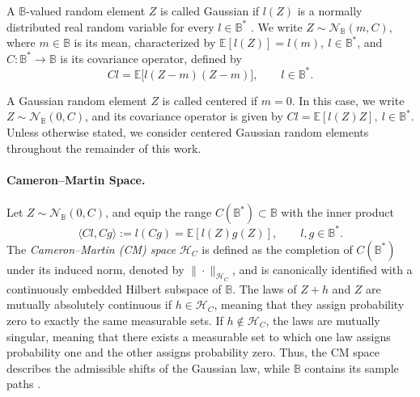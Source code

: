\documentclass[twoside,11pt]{article}
\newcommand{\inner}[2]{\langle #1, #2 \rangle} %
\begin{document}
A $\mathbb{B}$-valued random element $Z$ is called Gaussian if $l(Z)$ is a normally distributed real random variable for every $l\in\mathbb{B}^*$ \citep{ledoux1991probability}. We write $Z\sim\mathcal{N}_{\mathbb{B}}(m,C)$, where $m\in\mathbb B$ is its mean, characterized by $\mathbb{E}[l(Z)] = l(m),\ l\in \mathbb{B}^*$,  and $C:\mathbb{B}^*\to\mathbb{B}$ is its covariance operator, defined by
\[
C l 
=
\mathbb{E}\big[l(Z-m)(Z-m)\big],
\qquad l\in\mathbb{B}^*.
\]

A Gaussian random element $Z$ is called centered if $m = 0$. In this case, we write $Z\sim \mathcal{N}_{\mathbb{B}}(0,C)$, and its covariance operator is given by $Cl = \mathbb{E}[l(Z)Z],\ l\in\mathbb{B}^*$. Unless otherwise stated, we consider centered Gaussian random elements throughout the remainder of this work.

\paragraph{Cameron--Martin Space.} Let $Z\sim \mathcal{N}_{\mathbb{B}}(0,C)$, and equip the range $C(\mathbb{B}^*) \subset \mathbb{B}$ with the inner product
\[
\inner{Cl}{Cg} := l(Cg) = \mathbb{E} [l(Z)g(Z)], \qquad l, g \in \mathbb{B}^*.
\]
The \emph{Cameron--Martin (CM) space} $\mathcal{H}_C$ is defined as the completion of $C(\mathbb{B}^*)$ under its induced norm, denoted by $\|\cdot\|_{\mathcal{H}_C}$, and is canonically identified with a continuously embedded Hilbert subspace of $\mathbb B$. The laws of $Z+h$ and $Z$ are mutually absolutely continuous if $h\in\mathcal H_C$, meaning that they assign probability zero to exactly the same measurable sets. If $h\notin\mathcal H_C$, the laws are mutually singular, meaning that there exists a measurable set to which one law assigns probability one and the other assigns probability zero. Thus, the CM space describes the admissible shifts of the Gaussian law, while $\mathbb B$ contains its sample paths \citep{van2008reproducing}.
\end{document}

